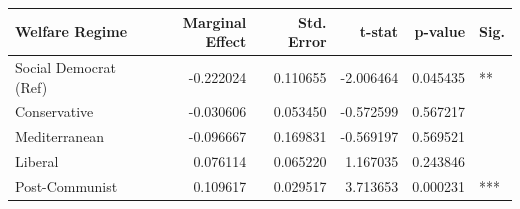 \begin{tabular}{lrrrrl}
\toprule
Welfare Regime & Marginal Effect & Std. Error & t-stat & p-value & Sig. \\
\midrule
Social Democrat (Ref) & -0.222024 & 0.110655 & -2.006464 & 0.045435 & ** \\
Conservative & -0.030606 & 0.053450 & -0.572599 & 0.567217 &  \\
Mediterranean & -0.096667 & 0.169831 & -0.569197 & 0.569521 &  \\
Liberal & 0.076114 & 0.065220 & 1.167035 & 0.243846 &  \\
Post-Communist & 0.109617 & 0.029517 & 3.713653 & 0.000231 & *** \\
\bottomrule
\end{tabular}
